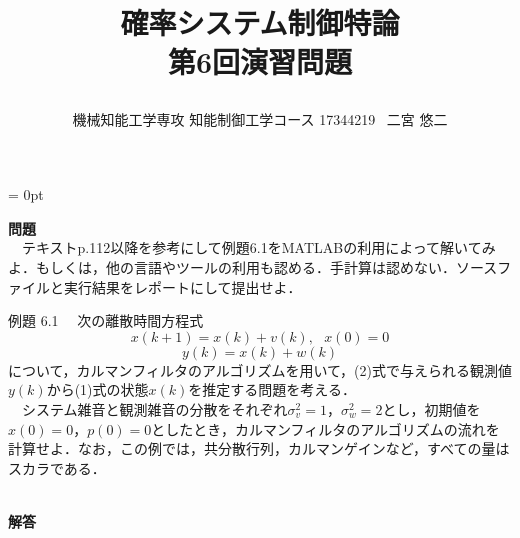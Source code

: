 \documentclass[a4paper,11pt]{jarticle}
\title{\vspace{-20truemm}
{\normalsize \rightline{平成29年\ 11月\ 1日}}
{\large 確率システム制御特論\\}
第6回演習問題\\
\date{}
\vspace{-2truemm}}
\author{機械知能工学専攻 知能制御工学コース \hspace{3mm} 17344219 \ 二宮 悠二}
\begin{document}

\parindent = 0pt %
\titlepage
\maketitle
{\Large{\bf 問題}}
\vspace{2mm}\\
\ \ テキストp.112以降を参考にして例題6.1をMATLABの利用によって解いてみよ．もしくは，他の言語やツールの利用も認める．手計算は認めない．ソースファイルと実行結果をレポートにして提出せよ．\\
\begin{itembox}[l]{例題 6.1}
 \ \ 次の離散時間方程式
\begin{equation}
 x(k+1) = x(k) + v(k) , ~~~ x(0) = 0
\end{equation}
\begin{equation}
 y(k) = x(k) + w(k)
\end{equation}
について，カルマンフィルタのアルゴリズムを用いて，(2)式で与えられる観測値$ y(k) $から(1)式の状態$ x(k) $を推定する問題を考える．\\
\ \ システム雑音と観測雑音の分散をそれぞれ$ \sigma_v^2 = 1 $，$ \sigma_w^2 = 2 $とし，初期値を$ \widehat{x}(0) = 0 $，$ p(0) = 0 $としたとき，カルマンフィルタのアルゴリズムの流れを計算せよ．なお，この例では，共分散行列，カルマンゲインなど，すべての量はスカラである．
\end{itembox}
\vspace{5mm}\\
{\Large{\bf 解答}}
\end{document}
